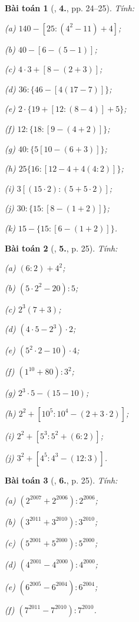 \documentclass{article}
\numberwithin{equation}{section}
\newtheorem{baitoan}{Bài toán}[section]
\begin{document}
\begin{baitoan}[\cite{Trong_Toan_6_2021}, \textbf{4.}, pp. 24--25]
	Tính:
	\begin{enumerate*}
		\item[(a)] $140 - [25 :(4^2 - 11) + 4]$;
		\item[(b)] $40 - [6 - (5 - 1)]$;
		\item[(c)] $4\cdot 3 + [8 - (2 + 3)]$;
		\item[(d)] $36:\{46 - [4(17 - 7)]\}$;
		\item[(e)] $2\cdot\{19 + [12:(8 - 4)] + 5\}$;
		\item[(f)] $12:\{18:[9 - (4 + 2)]\}$;
		\item[(g)] $40:\{5[10 - (6 + 3)]\}$;
		\item[(h)] $25\{16:[12 - 4 + 4(4:2)]\}$;
		\item[(i)] $3[(15\cdot 2):(5 + 5\cdot 2)]$;
		\item[(j)] $30:\{15:[8 - (1 + 2)]\}$;
		\item[(k)] $15 - \{15:[6 - (1 + 2)]\}$.
	\end{enumerate*}
\end{baitoan}

\begin{baitoan}[\cite{Trong_Toan_6_2021}, \textbf{5.}, p. 25]
	Tính:
	\begin{enumerate*}
		\item[(a)] $(6:2) + 4^2$;
		\item[(b)] $(5\cdot 2^2 - 20):5$;
		\item[(c)] $2^3(7 + 3)$;
		\item[(d)] $(4\cdot 5 - 2^3)\cdot 2$;
		\item[(e)] $(5^2\cdot 2 - 10)\cdot 4$;
		\item[(f)] $(1^{10} + 80):3^2$;
		\item[(g)] $2^3\cdot 5 - (15 - 10)$;
		\item[(h)] $2^2 + [10^5:10^4 - (2 + 3\cdot 2)]$;
		\item[(i)] $2^2 + [5^3:5^2 + (6:2)]$;
		\item[(j)] $3^2 + [4^5:4^3 - (12:3)]$.
	\end{enumerate*}
\end{baitoan}

\begin{baitoan}[\cite{Trong_Toan_6_2021}, \textbf{6.}, p. 25]
	Tính:
	\begin{enumerate*}
		\item[(a)] $(2^{2007} + 2^{2006}):2^{2006}$;
		\item[(b)] $(3^{2011} + 3^{2010}):3^{2010}$;
		\item[(c)] $(5^{2001} + 5^{2000}):5^{2000}$;
		\item[(d)] $(4^{2001} - 4^{2000}):4^{2000}$;
		\item[(e)] $(6^{2005} - 6^{2004}):6^{2004}$;
		\item[(f)] $(7^{2011} - 7^{2010}):7^{2010}$.
	\end{enumerate*}
\end{baitoan}
\end{document}
